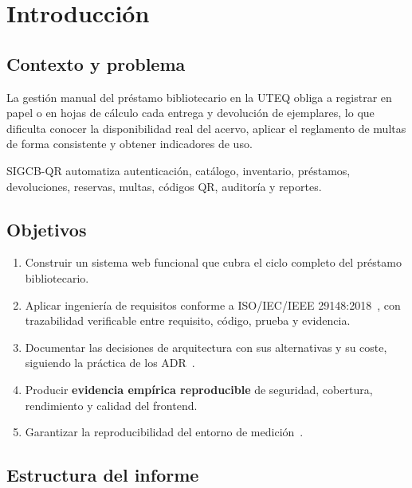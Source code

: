 \documentclass[11pt,a4paper]{article}
\begin{document}
\newpage

\section{Introducción}

\subsection{Contexto y problema}

La gestión manual del préstamo bibliotecario en la UTEQ obliga a registrar en
papel o en hojas de cálculo cada entrega y devolución de ejemplares, lo que
dificulta conocer la disponibilidad real del acervo, aplicar el reglamento de
multas de forma consistente y obtener indicadores de uso.

SIGCB-QR automatiza autenticación, catálogo, inventario, préstamos, devoluciones,
reservas, multas, códigos QR, auditoría y reportes.

\subsection{Objetivos}

\begin{enumerate}[label=\textbf{O\arabic*.},leftmargin=*]
  \item Construir un sistema web funcional que cubra el ciclo completo del
        préstamo bibliotecario.
  \item Aplicar ingeniería de requisitos conforme a ISO/IEC/IEEE
        29148:2018~\cite{iso29148}, con trazabilidad verificable entre requisito,
        código, prueba y evidencia.
  \item Documentar las decisiones de arquitectura con sus alternativas y su coste,
        siguiendo la práctica de los ADR~\cite{nygard2011adr}.
  \item Producir \textbf{evidencia empírica reproducible} de seguridad, cobertura,
        rendimiento y calidad del frontend.
  \item Garantizar la reproducibilidad del entorno de medición~\cite{boettiger2015introduction}.
\end{enumerate}

\subsection{Estructura del informe}
\end{document}
